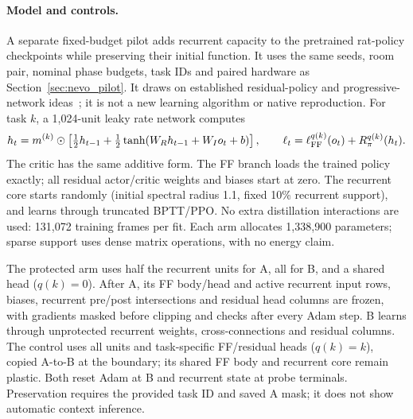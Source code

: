 \documentclass[10pt,onecolumn,letterpaper]{article}
\begin{document}
\paragraph{Model and controls.}
A separate fixed-budget pilot adds recurrent capacity to the pretrained rat-policy checkpoints while
preserving their initial function. It uses the same seeds, room pair, nominal phase budgets, task IDs and
paired hardware as Section~\ref{sec:nevo_pilot}. It draws on established residual-policy and progressive-network
ideas~\cite{johannink2018residual,rusu2016progressive}; it is not a new learning algorithm or native reproduction.
For task $k$, a 1,024-unit leaky rate network computes
\begin{equation}
h_t=m^{(k)}\odot\left[\tfrac12h_{t-1}+\tfrac12\tanh(W_Rh_{t-1}+W_Io_t+b)\right],\qquad
\ell_t=\ell_{\rm FF}^{q(k)}(o_t)+R_\pi^{q(k)}(h_t).
\end{equation}
The critic has the same additive form. The FF branch loads the trained policy exactly;
all residual actor/critic weights and biases start at zero. The recurrent core starts randomly
(initial spectral radius 1.1, fixed 10\% recurrent support), and learns through truncated BPTT/PPO.
No extra distillation interactions are used: 131,072 training frames per fit.
Each arm allocates 1,338,900 parameters; sparse support uses dense matrix operations, with no energy claim.

The protected arm uses half the recurrent units for A, all for B, and a shared head ($q(k)=0$).
After A, its FF body/head and active recurrent input rows, biases, recurrent pre/post intersections and residual
head columns are frozen, with gradients masked before clipping and checks after every Adam step.
B learns through unprotected recurrent weights, cross-connections and residual columns.
The control uses all units and task-specific FF/residual heads ($q(k)=k$), copied A-to-B at the boundary;
its shared FF body and recurrent core remain plastic. Both reset Adam at B and recurrent state at probe terminals.
Preservation requires the provided task ID and saved A mask; it does not show automatic context inference.
\end{document}
